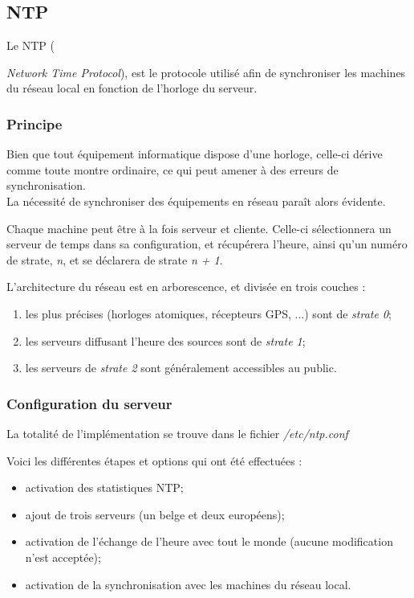 \subsection{NTP}
\label{subsec:ntp}

Le NTP ({\emph{Network Time Protocol}), est le protocole utilisé afin
de synchroniser les machines du réseau local en fonction de l'horloge du
serveur.

\subsubsection{Principe}
\label{subsubsec:principe}

Bien que tout équipement informatique dispose d'une horloge, celle-ci
dérive comme toute montre ordinaire, ce qui peut amener à des erreurs de
synchronisation. \\
La nécessité de synchroniser des équipements en réseau paraît alors évidente.

Chaque machine peut être à la fois serveur et cliente.  Celle-ci sélectionnera
un serveur de temps dans sa configuration, et récupérera l'heure, ainsi qu'un
numéro de strate, \emph{n}, et se déclarera de strate \emph{n + 1}.

L'architecture du réseau est en arborescence, et divisée en trois couches :
\begin{enumerate}
\item les plus précises (horloges atomiques, récepteurs GPS, ...) sont
de \emph{strate 0};

\item les serveurs diffusant l'heure des sources sont de \emph{strate 1};

\item les serveurs de \emph{strate 2} sont généralement accessibles au public.
\end{enumerate}

\subsubsection{Configuration du serveur}
\label{subsubsec:configuration-serveur}

La totalité de l'implémentation se trouve dans le fichier
\textit{/etc/ntp.conf}

Voici les différentes étapes et options qui ont été effectuées :
\begin{itemize}
\item activation des statistiques NTP;
\item ajout de trois serveurs (un belge et deux européens);
\item activation de l'échange de l'heure avec tout le monde (aucune
  modification n'est acceptée);
\item activation de la synchronisation avec les machines du réseau local.
\end{itemize}

}
